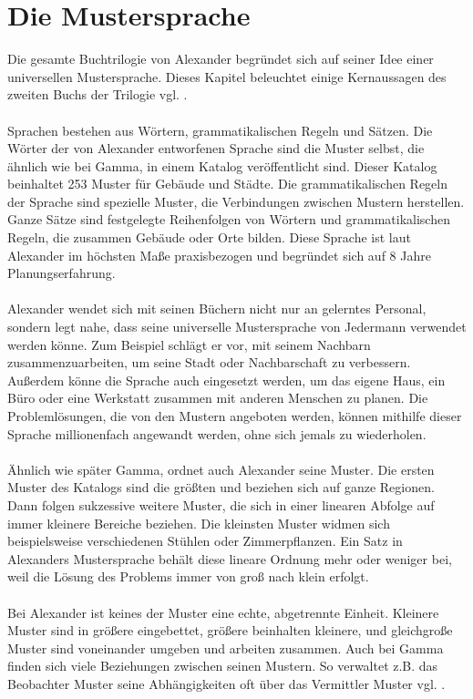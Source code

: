 \documentclass[fontsize=11pt,a4paper,final]{scrreprt}[2003/01/01]
\begin{document}
\section{Die Mustersprache}
Die gesamte Buchtrilogie von Alexander begründet sich auf seiner Idee einer universellen Mustersprache. Dieses Kapitel beleuchtet einige Kernaussagen des zweiten Buchs der Trilogie vgl. \cite[S. IX - XLIV]{Alexander1977}. \\ \\
Sprachen bestehen aus Wörtern, grammatikalischen Regeln und Sätzen. Die Wörter der von Alexander entworfenen Sprache sind die Muster selbst, die ähnlich wie bei Gamma, in einem Katalog veröffentlicht sind. Dieser Katalog beinhaltet 253 Muster für Gebäude und Städte. Die grammatikalischen Regeln der Sprache sind spezielle Muster, die Verbindungen zwischen Mustern herstellen. Ganze Sätze sind festgelegte Reihenfolgen von Wörtern und grammatikalischen Regeln, die zusammen Gebäude oder Orte bilden. Diese Sprache ist laut Alexander im höchsten Maße praxisbezogen und begründet sich auf 8 Jahre Planungserfahrung. \\ \\
Alexander wendet sich mit seinen Büchern nicht nur an gelerntes Personal, sondern legt  nahe, dass seine universelle Mustersprache von Jedermann verwendet werden könne. Zum Beispiel schlägt er vor, mit seinem Nachbarn zusammenzuarbeiten, um seine Stadt oder Nachbarschaft zu verbessern. Außerdem könne die Sprache auch eingesetzt werden, um das eigene Haus, ein Büro oder eine Werkstatt zusammen mit anderen Menschen zu planen. Die Problemlösungen, die von den Mustern angeboten werden, können mithilfe dieser Sprache millionenfach angewandt werden, ohne sich jemals zu wiederholen. \\ \\
Ähnlich wie später Gamma, ordnet auch Alexander seine Muster. Die ersten Muster des Katalogs sind die größten und beziehen sich auf ganze Regionen. Dann folgen sukzessive weitere Muster, die sich in einer linearen Abfolge auf immer kleinere Bereiche beziehen. Die kleinsten Muster widmen sich beispielsweise verschiedenen Stühlen oder Zimmerpflanzen. Ein Satz in Alexanders Mustersprache behält diese lineare Ordnung mehr oder weniger bei, weil die Lösung des Problems immer von groß nach klein erfolgt. \\ \\
Bei Alexander ist keines der Muster eine echte, abgetrennte Einheit. Kleinere Muster sind in größere eingebettet, größere beinhalten kleinere, und gleichgroße Muster sind voneinander umgeben und arbeiten zusammen. Auch bei Gamma finden sich viele Beziehungen zwischen seinen Mustern. So verwaltet z.B. das Beobachter Muster seine Abhängigkeiten oft über das Vermittler Muster vgl. \cite[S. 16]{gamma2004}. \\ \\
\end{document}
